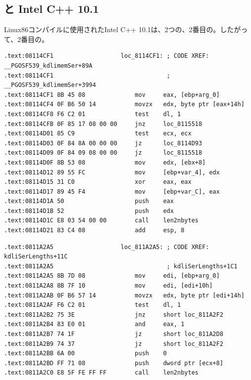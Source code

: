 \label{anomaly:Intel}
\myindex{\CompilerAnomaly}

\subsection{ と Intel C++ 10.1}

\myindex{\oracle}

 Linux86コンパイルに使用されたIntel C++ 10.1は、2つの、2番目の。したがって、2番目の。

\begin{lstlisting}[caption=libserver11.aのkdli.o,style=customasmx86]
.text:08114CF1                   loc_8114CF1: ; CODE XREF: __PGOSF539_kdlimemSer+89A
.text:08114CF1                                ; __PGOSF539_kdlimemSer+3994
.text:08114CF1 8B 45 08              mov     eax, [ebp+arg_0]
.text:08114CF4 0F B6 50 14           movzx   edx, byte ptr [eax+14h]
.text:08114CF8 F6 C2 01              test    dl, 1
.text:08114CFB 0F 85 17 08 00 00     jnz     loc_8115518
.text:08114D01 85 C9                 test    ecx, ecx
.text:08114D03 0F 84 8A 00 00 00     jz      loc_8114D93
.text:08114D09 0F 84 09 08 00 00     jz      loc_8115518
.text:08114D0F 8B 53 08              mov     edx, [ebx+8]
.text:08114D12 89 55 FC              mov     [ebp+var_4], edx
.text:08114D15 31 C0                 xor     eax, eax
.text:08114D17 89 45 F4              mov     [ebp+var_C], eax
.text:08114D1A 50                    push    eax
.text:08114D1B 52                    push    edx
.text:08114D1C E8 03 54 00 00        call    len2nbytes
.text:08114D21 83 C4 08              add     esp, 8
\end{lstlisting}

\begin{lstlisting}[caption=同じコードから,style=customasmx86]
.text:0811A2A5                   loc_811A2A5: ; CODE XREF: kdliSerLengths+11C
.text:0811A2A5                                ; kdliSerLengths+1C1
.text:0811A2A5 8B 7D 08              mov     edi, [ebp+arg_0]
.text:0811A2A8 8B 7F 10              mov     edi, [edi+10h]
.text:0811A2AB 0F B6 57 14           movzx   edx, byte ptr [edi+14h]
.text:0811A2AF F6 C2 01              test    dl, 1
.text:0811A2B2 75 3E                 jnz     short loc_811A2F2
.text:0811A2B4 83 E0 01              and     eax, 1
.text:0811A2B7 74 1F                 jz      short loc_811A2D8
.text:0811A2B9 74 37                 jz      short loc_811A2F2
.text:0811A2BB 6A 00                 push    0
.text:0811A2BD FF 71 08              push    dword ptr [ecx+8]
.text:0811A2C0 E8 5F FE FF FF        call    len2nbytes
\end{lstlisting}

